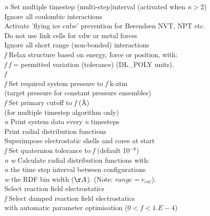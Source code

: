 \begin{tabbing}
 {\em n} \> Set multiple timestep (multi-step)interval 
(activated when {\em n}$>$2)\\
 \> Ignore all coulombic interactions\\
 \> Activate 'flying ice cube' prevention for Berendsen NVT, NPT etc.\\ 
 \> Do not use link cells for vdw or metal forces\\
 \> Ignore all short range (non-bonded) interactions\\
 {\em f} \> Relax structure based on energy, force or
position, with: \\
 {\em f} \> {\em f} = permitted variation (tolerance)
(DL\_POLY units).\\
 {\em f} \> \\
 {\em f} \> Set required system pressure to {\em f} k-atm
\\
\> \> (target pressure for constant pressure ensembles)\\
  {\em f}\> Set primary cutoff to {\em f} (\AA) \\
\> \> (for multiple timestep algorithm only)\\
 {\em n} \> Print system data every {\em n} timesteps \\
 \> Print radial distribution functions \\
 \> Superimpose electrostatic shells and cores at start\\
 {\em f} \> Set quaternion tolerance to  {\em f}
 (default 10$^{-8}$)\\
 {\em n w}\> Calculate radial distribution functions with:\\
\> \> {\em n} the time step interval between configurations \\
\> \> {\em w} the RDF bin width ($\AA$). (Note: $range=r_{cut}$).\\
 \> Select reaction field electrostatics\\
 {\em f}\> Select damped reaction field
 electrostatics \\
\> \> with automatic parameter optimisation ($0<f<1.E-4$) \\

\end{tabbing}
